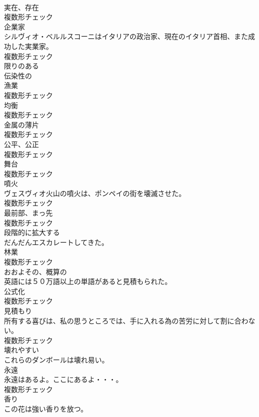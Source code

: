 \documentclass[8pt]{extreport}
\begin{document}
\begin{CJK}{UTF8}{min}
\\	[名詞]	実在、存在	
\\	複数形チェック
\\	[名詞]	企業家	
\\	シルヴィオ・ベルルスコーニはイタリアの政治家、現在のイタリア首相、また成功した実業家。	
\\	複数形チェック
\\	[形容詞]	限りのある	
\\	[形容詞]	伝染性の	
\\	[名詞]	漁業	
\\	複数形チェック
\\	[名詞]	均衡	
\\	複数形チェック
\\	[名詞]	金属の薄片	
\\	複数形チェック
\\	[名詞]	公平、公正	
\\	複数形チェック
\\	[名詞]	舞台	
\\	複数形チェック
\\	[名詞]	噴火	
\\	ヴェスヴィオ火山の噴火は、ポンペイの街を壊滅させた。	
\\	複数形チェック
\\	[名詞]	最前部、まっ先	
\\	複数形チェック
\\	[動詞]	段階的に拡大する	
\\	だんだんエスカレートしてきた。	
\\	[名詞]	林業	
\\	複数形チェック
\\	[形容詞]	おおよその、概算の	
\\	英語には５０万語以上の単語があると見積もられた。	
\\	[名詞]	公式化	
\\	複数形チェック
\\	[名詞]	見積もり	
\\	所有する喜びは、私の思うところでは、手に入れる為の苦労に対して割に合わない。	
\\	複数形チェック
\\	[形容詞]	壊れやすい	
\\	これらのダンボールは壊れ易い。	
\\	[名詞]	永遠	
\\	永遠はあるよ。ここにあるよ・・・。	
\\	複数形チェック
\\	[名詞]	香り	
\\	この花は強い香りを放つ。	

\end{CJK}
\end{document}
